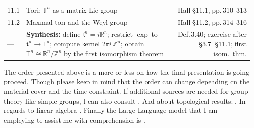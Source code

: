 \begin{assignment}[
  header=HeaderA,
  body=BodyA,
  title={Guia de Projecto},
  duedate={\today},
  toc=false,
  toctitle={},
  exlist=false
]
\begin{table}[H]
\begin{tabular}{@{} p{0.55cm} p{7.2cm} R @{}}
\midrule

11.1 & Tori; $\mathbb{T}^{n}$ as a matrix Lie group
       & Hall \S11.1, pp.\,310--313 \\[4pt]
 
11.2 & Maximal tori and the Weyl group
       & Hall \S11.2, pp.\,314--316 \\[6pt]
 
\midrule
 
--- & \textbf{Synthesis:}
      define $\mathfrak{t}^{n}=i\mathbb{R}^{n}$;
      restrict $\exp$ to $\mathfrak{t}^{n}\to\mathbb{T}^{n}$;
      compute kernel $2\pi i\,\mathbb{Z}^{n}$;
      obtain $\mathbb{T}^{n}\cong\mathbb{R}^{n}/\mathbb{Z}^{n}$
      by the first isomorphism theorem
      & Def.\,3.40; exercise after \S3.7;
        \S11.1; first isom.\ thm. \\[4pt]
 
\bottomrule
\end{tabular}
\end{table}

The order presented above is a more or less on how the final presentation is going proceed. Though please keep in mind that the order can change depending on the material cover and the time constraint. If additional sources are needed for group theory like simple groups, I can also consult \textcite{silverman2022abstract}. And about topological results: \textcite{lopez2014point}. In regards to linear algebra \textcite{axler2024linear}. Finally the Large Language model that I am employing to assist me with comprehension is \textcite{claude2025}.  


\end{assignment}